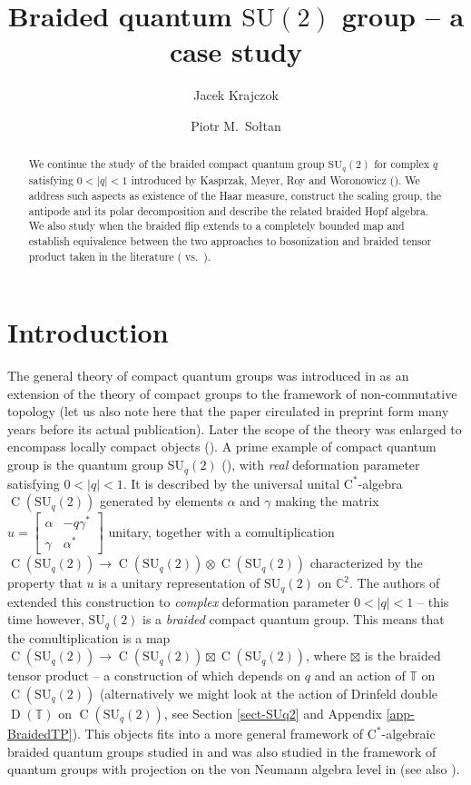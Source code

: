 \documentclass[12pt,reqno,a4paper]{amsart}
\title[Braided quantum $\mathrm{SU}(2)$ group]{Braided quantum $\mathrm{SU}(2)$ group -- a case study}
\author{Jacek Krajczok}
\author{Piotr M.~So{\l}tan}
\theoremstyle{definition}
\newcommand{\cst}{\ensuremath{\mathrm{C}^*}}
\newcommand{\tens}{\otimes}
\newcommand{\CC}{\mathbb{C}}
\newcommand{\TT}{\mathbb{T}}
\DeclareMathOperator{\C}{C}
\DeclareMathOperator{\D}{D}
\newcommand{\SU}{\mathrm{SU}}
\numberwithin{equation}{section}
\begin{document}
\begin{abstract}
We continue the study of the braided compact quantum group $\mathrm{SU}_q(2)$ for complex $q$ satisfying $0<|q|<1$ introduced by Kasprzak, Meyer, Roy and Woronowicz (\cite{BraidedSU2}). We address such aspects as existence of the Haar measure, construct the scaling group, the antipode and its polar decomposition and describe the related braided Hopf algebra. We also study when the braided flip extends to a completely bounded map and establish equivalence between the two approaches to bosonization and braided tensor product taken in the literature (\cite{BraidedSU2} vs.~\cite{MeyerRoyWoronowiczI,RoyBraided, DeCommerKrajczok}).
\end{abstract}

\maketitle

\tableofcontents

\allowdisplaybreaks

\section{Introduction}

The general theory of compact quantum groups was introduced in \cite{CQGs} as an extension of the theory of compact groups to the framework of non-commutative topology (let us also note here that the paper \cite{CQGs} circulated in preprint form many years before its actual publication). Later the scope of the theory was enlarged to encompass locally compact objects (\cite{lcqg,mnw}). A prime example of compact quantum group is the quantum group $\SU_q(2)$ (\cite{su2}), with \emph{real} deformation parameter satisfying $0<|q|<1$. It is described by the universal unital \cst-algebra $\C(\SU_q(2))$ generated by elements $\alpha$ and $\gamma$ making the matrix $u=\left[\begin{smallmatrix}\alpha&-q\gamma^*\\\gamma&\alpha^*\end{smallmatrix}\right]$ unitary, together with a comultiplication $\C(\SU_q(2))\to\C(\SU_q(2))\tens\C(\SU_q(2))$ characterized by the property that $u$ is a unitary representation of $\SU_q(2)$ on $\CC^2$. The authors of \cite{BraidedSU2} extended this construction to \emph{complex} deformation parameter $0<|q|<1$ -- this time however, $\SU_q(2)$ is a \emph{braided} compact quantum group. This means that the comultiplication is a map $\C(\SU_q(2))\to\C(\SU_q(2))\boxtimes\C(\SU_q(2))$, where $\boxtimes$ is the braided tensor product -- a construction of which depends on $q$ and an action of $\TT$ on $\C(\SU_q(2))$ (alternatively we might look at the action of Drinfeld double $\D(\TT)$ on $\C(\SU_q(2))$, see Section \ref{sect-SUq2} and Appendix \ref{app-BraidedTP}). This objects fits into a more general framework of \cst-algebraic braided quantum groups studied in \cite{ExampleBraided,MeyerRoyWoronowiczII,RoyBraided} and was also studied in the framework of quantum groups with projection on the von Neumann algebra level in \cite{KaspSol2020} (see also \cite{KaspSol2015}).
\end{document}
